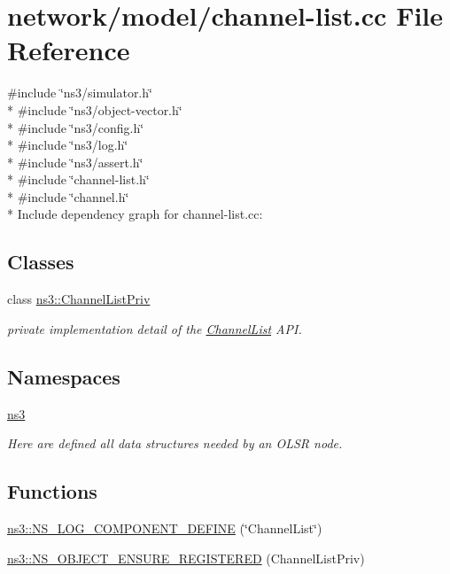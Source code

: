 \hypertarget{channel-list_8cc}{}\section{network/model/channel-\/list.cc File Reference}
\label{channel-list_8cc}
{\ttfamily \#include \char`\"{}ns3/simulator.\+h\char`\"{}}\\*
{\ttfamily \#include \char`\"{}ns3/object-\/vector.\+h\char`\"{}}\\*
{\ttfamily \#include \char`\"{}ns3/config.\+h\char`\"{}}\\*
{\ttfamily \#include \char`\"{}ns3/log.\+h\char`\"{}}\\*
{\ttfamily \#include \char`\"{}ns3/assert.\+h\char`\"{}}\\*
{\ttfamily \#include \char`\"{}channel-\/list.\+h\char`\"{}}\\*
{\ttfamily \#include \char`\"{}channel.\+h\char`\"{}}\\*
Include dependency graph for channel-\/list.cc\+:
\subsection*{Classes}
\begin{DoxyCompactItemize}
\item 
class \hyperlink{classns3_1_1ChannelListPriv}{ns3\+::\+Channel\+List\+Priv}
\begin{DoxyCompactList}\small\item\em private implementation detail of the \hyperlink{classns3_1_1ChannelList}{Channel\+List} A\+PI. \end{DoxyCompactList}\end{DoxyCompactItemize}
\subsection*{Namespaces}
\begin{DoxyCompactItemize}
\item 
 \hyperlink{namespacens3}{ns3}
\begin{DoxyCompactList}\small\item\em Here are defined all data structures needed by an O\+L\+SR node. \end{DoxyCompactList}\end{DoxyCompactItemize}
\subsection*{Functions}
\begin{DoxyCompactItemize}
\item 
\hyperlink{namespacens3_ae723d1736733f628f82b05725ddbf2ae}{ns3\+::\+N\+S\+\_\+\+L\+O\+G\+\_\+\+C\+O\+M\+P\+O\+N\+E\+N\+T\+\_\+\+D\+E\+F\+I\+NE} (\char`\"{}Channel\+List\char`\"{})
\item 
\hyperlink{namespacens3_a579ea7b2171d56d333f22066f6f24807}{ns3\+::\+N\+S\+\_\+\+O\+B\+J\+E\+C\+T\+\_\+\+E\+N\+S\+U\+R\+E\+\_\+\+R\+E\+G\+I\+S\+T\+E\+R\+ED} (Channel\+List\+Priv)
\end{DoxyCompactItemize}
